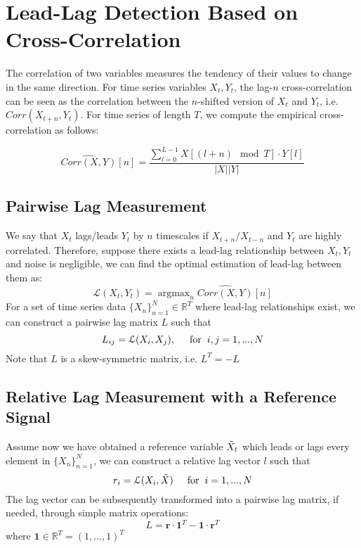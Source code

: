 \documentclass[sigconf]{acmart}
\DeclareMathOperator*{\argmax}{argmax}
\begin{document}
\section{Lead-Lag Detection Based on Cross-Correlation}
The correlation of two variables measures the tendency of their values to change in the same direction. For time series variables $X_t, Y_t$, the lag-$n$ cross-correlation can be seen as the correlation between the $n$-shifted version of $X_t$ and $Y_t$, i.e. $Corr(X_{t+n},Y_t)$. For time series of length $T$, we compute the empirical cross-correlation as follows:

$$\widehat{Corr(X,Y)}[n]  = \frac{\sum_{l=0}^{L-1}X[(l+n)\mod T] \cdot Y[l]}{|X||Y|}$$

\subsection{Pairwise Lag Measurement}
\label{sec:pair}
We say that $X_t$ lags/leads $Y_t$ by $n$ timescales if $X_{t+n}/X_{t-n}$ and $Y_t$ are highly correlated. Therefore, suppose there exists a lead-lag relationship between $X_t, Y_t$ and noise is negligible, we can find the optimal estimation of lead-lag between them as:
$$\mathcal{L}(X_t,Y_t)=\argmax_n \widehat{Corr(X,Y)}[n]$$
For a set of time series data $\{X_n\}_{n=1}^N \in \mathbb{R}^T$ where lead-lag relationships exist, we can construct a pairwise lag matrix $L$ such that 
$$L_{ij} = \mathcal{L}(X_i,X_j), \hspace{.5cm} \text{for} \hspace{.2cm} i,j=1,...,N$$
Note that $L$ is a skew-symmetric matrix, i.e. $L^T = -L$
\subsection{Relative Lag Measurement with a Reference Signal}
\label{sec:rel_lag}
Assume now we have obtained a reference variable $\Tilde{X}_t$ which leads or lags every element in $\{X_n\}_{n=1}^N$, we can construct a relative lag vector $l$ such that 
$$r_{i} = \mathcal{L}(X_i,\Tilde{X})\hspace{.5cm} \text{for} \hspace{.2cm} i=1,...,N$$
The lag vector can be subsequently transformed into a pairwise lag matrix, if needed, through simple matrix operations:
$$L = \mathbf{r}\cdot \mathbf{1}^T - \mathbf{1}\cdot \mathbf{r}^T$$
where $\mathbf{1} \in \mathbb{R}^T = (1,...,1)^T$
\end{document}
